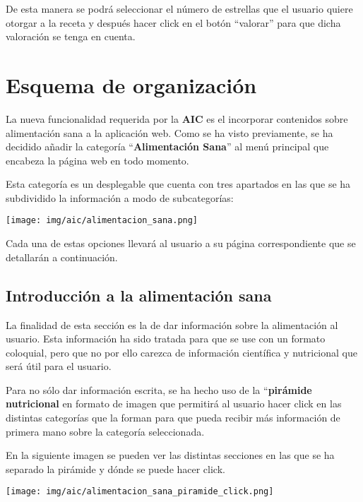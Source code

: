\documentclass{\ClassPath/viu-tfm-template}
\begin{document}
De esta manera se podrá seleccionar el número de estrellas que el usuario quiere otorgar a la receta y después hacer click en el botón “valorar” para que dicha valoración se tenga en cuenta.


\chapter{Esquema de organización}

La nueva funcionalidad requerida por la \textbf{AIC} es el incorporar contenidos sobre alimentación sana a la aplicación web. Como se ha visto previamente, se ha decidido añadir la categoría “\textbf{Alimentación Sana}” al menú principal que encabeza la página web en todo momento.

Esta categoría es un desplegable que cuenta con tres apartados en las que se ha subdividido la información a modo de subcategorías:

\begin{center}
    \vspace{-10pt}
    \texttt{[image: img/aic/alimentacion\_sana.png]}
    \vspace{-20pt}
\end{center}


Cada una de estas opciones llevará al usuario a su página correspondiente que se detallarán a continuación.


\section{Introducción a la alimentación sana}
La finalidad de esta sección es la de dar información sobre la alimentación al usuario. Esta información ha sido tratada para que se use con un formato coloquial, pero que no por ello carezca de información científica y nutricional que será útil para el usuario.

Para no sólo dar información escrita, se ha hecho uso de la “\textbf{pirámide nutricional} en formato de imagen que permitirá al usuario hacer click en las distintas categorías que la forman para que pueda recibir más información de primera mano sobre la categoría seleccionada.

En la siguiente imagen se pueden ver las distintas secciones en las que se ha separado la pirámide y dónde se puede hacer click.
\begin{center}
    \vspace{-10pt}
    \texttt{[image: img/aic/alimentacion\_sana\_piramide\_click.png]}
    \vspace{-20pt}
\end{center}
\end{document}
